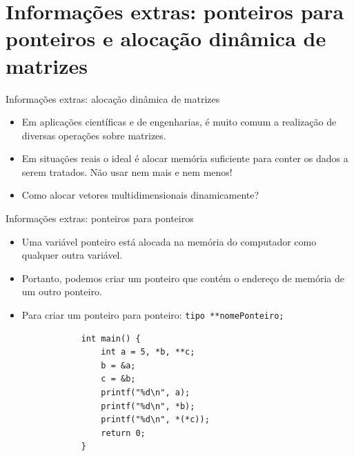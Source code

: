 \documentclass[handout]{beamer}
\newcommand{\cod}[1]{\texttt{#1}}
\begin{document}
\section{Informações extras: ponteiros para ponteiros e alocação dinâmica de matrizes}

\begin{frame}[fragile]{Informações extras: alocação dinâmica de matrizes}

    \begin{itemize}
        \item Em aplicações científicas e de engenharias, é muito comum a realização de diversas operações sobre matrizes.
        \item Em situações reais o ideal é alocar memória suficiente para conter os dados a serem tratados. Não usar nem mais e nem menos!
        \item Como alocar vetores multidimensionais dinamicamente?
    \end{itemize}

\end{frame}

\begin{frame}[fragile]{Informações extras: ponteiros para ponteiros}

    \begin{itemize}
        \item Uma variável ponteiro está alocada na memória do computador como qualquer outra variável.
        \item Portanto, podemos criar um ponteiro que contém o endereço de memória de um outro ponteiro.
        \item Para criar um ponteiro para ponteiro: \cod{tipo **nomePonteiro;}
        
        \begin{verbatim}
            int main() {
                int a = 5, *b, **c;
                b = &a;
                c = &b;
                printf("%d\n", a);
                printf("%d\n", *b);
                printf("%d\n", *(*c));
                return 0;
            }
        \end{verbatim}
    \end{itemize}

\end{frame}
\end{document}
